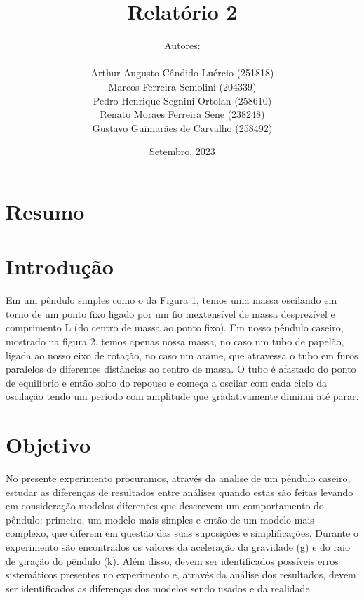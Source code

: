 \documentclass[a4paper]{report}
\title{\huge
{\textbf{Relatório 2}}
 \\
\fontsize{30pt}{36pt}\selectfont{\textbf{O Pêndulo Físico}}
}
\author{
Autores:\\ \ \\
Arthur Augusto Cândido Luércio (251818) \\
Marcos Ferreira Semolini (204339) \\
Pedro Henrique Segnini Ortolan (258610) \\
Renato Moraes Ferreira Sene (238248) \\
Gustavo Guimarães de Carvalho (258492)
}
\date{Setembro, 2023}
\begin{document}
\pagestyle{fancy}
\fancyfoot{}\fancyhead{}
\maketitle{}
\pagebreak
{}
\fancyfoot[R]{\thepage}
\section*{Resumo}
\section*{Introdução}
\qquad Em um pêndulo simples como o da Figura 1, temos uma massa oscilando em torno de um ponto fixo ligado por um fio inextensível de massa desprezível e comprimento L (do centro de massa ao ponto fixo). Em nosso pêndulo caseiro, mostrado na figura 2, temos apenas nossa massa, no caso um tubo de papelão, ligada ao nosso eixo de rotação, no caso um arame, que atravessa o tubo em furos paralelos de diferentes distâncias ao centro de massa. O tubo é afastado do ponto de equilíbrio e então solto do repouso e começa a oscilar com cada ciclo da oscilação tendo um período com amplitude que gradativamente diminui até parar. 
\section*{Objetivo}
\qquad No presente experimento procuramos, através da analise de um pêndulo caseiro, estudar as diferenças de resultados entre análises quando estas são feitas levando em consideração modelos diferentes que descrevem um comportamento do pêndulo: primeiro, um modelo mais simples e então de um modelo mais complexo, que diferem em questão das suas suposições e simplificações. Durante o experimento são encontrados os valores da aceleração da gravidade (g) e do raio de giração do pêndulo (k). Além disso, devem ser identificados possíveis erros sistemáticos presentes no experimento e, através da análise dos resultados, devem ser identificados as diferenças dos modelos sendo usados e da realidade.
\end{document}
